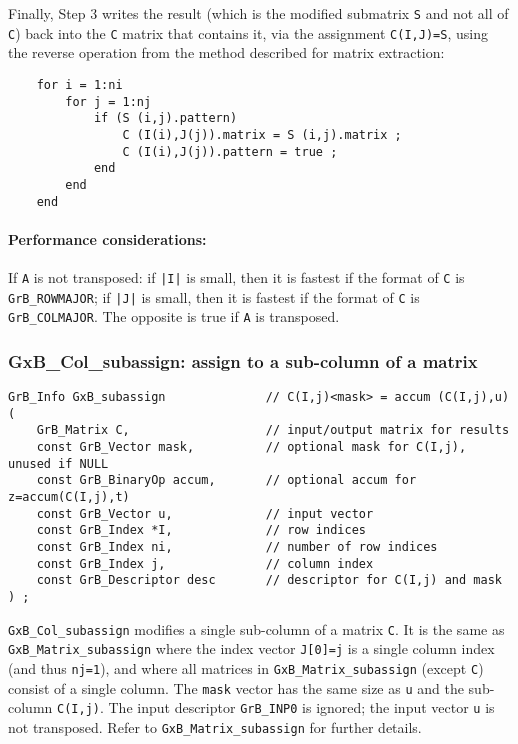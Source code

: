 \documentclass[12pt]{article}
\begin{document}
Finally, Step 3 writes the result (which is the modified submatrix \verb'S' and
not all of \verb'C') back into the \verb'C' matrix that contains it, via the
assignment \verb'C(I,J)=S', using the reverse operation from the method
described for matrix extraction:

    {\footnotesize
    \begin{verbatim}
    for i = 1:ni
        for j = 1:nj
            if (S (i,j).pattern)
                C (I(i),J(j)).matrix = S (i,j).matrix ;
                C (I(i),J(j)).pattern = true ;
            end
        end
    end \end{verbatim}}

\paragraph{\bf Performance considerations:} %
If \verb'A' is not transposed: if \verb'|I|' is small, then it is fastest if
the format of \verb'C' is \verb'GrB_ROWMAJOR'; if \verb'|J|' is small, then it is
fastest if the format of \verb'C' is \verb'GrB_COLMAJOR'.  The opposite is true
if \verb'A' is transposed.

\newpage
\subsubsection{{\sf GxB\_Col\_subassign:} assign to a sub-column of a matrix}
\label{subassign_column}

\begin{mdframed}[userdefinedwidth=6in]
{\footnotesize
\begin{verbatim}
GrB_Info GxB_subassign              // C(I,j)<mask> = accum (C(I,j),u)
(
    GrB_Matrix C,                   // input/output matrix for results
    const GrB_Vector mask,          // optional mask for C(I,j), unused if NULL
    const GrB_BinaryOp accum,       // optional accum for z=accum(C(I,j),t)
    const GrB_Vector u,             // input vector
    const GrB_Index *I,             // row indices
    const GrB_Index ni,             // number of row indices
    const GrB_Index j,              // column index
    const GrB_Descriptor desc       // descriptor for C(I,j) and mask
) ;
\end{verbatim} } \end{mdframed}

\verb'GxB_Col_subassign' modifies a single sub-column of a matrix \verb'C'.  It
is the same as \verb'GxB_Matrix_subassign' where the index vector \verb'J[0]=j'
is a single column index (and thus \verb'nj=1'), and where all matrices in
\verb'GxB_Matrix_subassign' (except \verb'C') consist of a single column.  The
\verb'mask' vector has the same size as \verb'u' and the sub-column
\verb'C(I,j)'.  The input descriptor \verb'GrB_INP0' is ignored; the input
vector \verb'u' is not transposed.  Refer to \verb'GxB_Matrix_subassign' for
further details.
\end{document}
